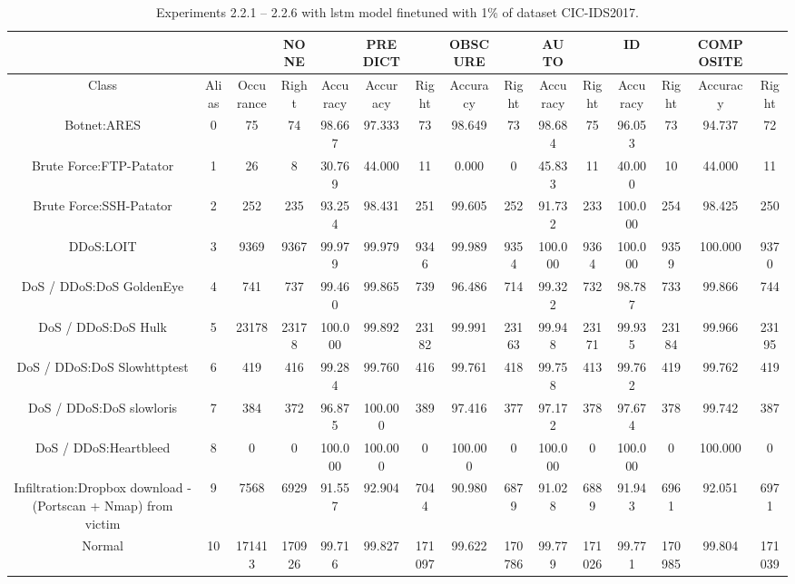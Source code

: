 \begin{table}[htb]
    \centering
    \caption{Experiments 2.2.1 – 2.2.6 with \gls{lstm} model finetuned with 1\% of dataset CIC-IDS2017.}
    \label{table:results:lstm:flows_1}
    \begin{tabular}{@{}ccccccccccccccc@{}}
        \toprule
         &  &  & NONE &  & PREDICT &  & OBSCURE &  & AUTO &  & ID &  & COMPOSITE &  \\
        \midrule
        Class &  Alias &  Occurance &  Right &  Accuracy &  Accuracy &  Right &  Accuracy &  Right &  Accuracy &  Right &  Accuracy &  Right &  Accuracy &  Right \\
        Botnet:ARES &  0 &  75 &  74 &  98.667 &  97.333 &  73 &  98.649 &  73 &  98.684 &  75 &  96.053 &  73 &  94.737 &  72 \\
        Brute Force:FTP-Patator &  1 &  26 &  8 &  30.769 &  44.000 &  11 &  0.000 &  0 &  45.833 &  11 &  40.000 &  10 &  44.000 &  11 \\
        Brute Force:SSH-Patator &  2 &  252 &  235 &  93.254 &  98.431 &  251 &  99.605 &  252 &  91.732 &  233 &  100.000 &  254 &  98.425 &  250 \\
        DDoS:LOIT &  3 &  9369 &  9367 &  99.979 &  99.979 &  9346 &  99.989 &  9354 &  100.000 &  9364 &  100.000 &  9359 &  100.000 &  9370 \\
        DoS / DDoS:DoS GoldenEye &  4 &  741 &  737 &  99.460 &  99.865 &  739 &  96.486 &  714 &  99.322 &  732 &  98.787 &  733 &  99.866 &  744 \\
        DoS / DDoS:DoS Hulk &  5 &  23178 &  23178 &  100.000 &  99.892 &  23182 &  99.991 &  23163 &  99.948 &  23171 &  99.935 &  23184 &  99.966 &  23195 \\
        DoS / DDoS:DoS Slowhttptest &  6 &  419 &  416 &  99.284 &  99.760 &  416 &  99.761 &  418 &  99.758 &  413 &  99.762 &  419 &  99.762 &  419 \\
        DoS / DDoS:DoS slowloris &  7 &  384 &  372 &  96.875 &  100.000 &  389 &  97.416 &  377 &  97.172 &  378 &  97.674 &  378 &  99.742 &  387 \\
        DoS / DDoS:Heartbleed &  8 &  0 &  0 &  100.000 &  100.000 &  0 &  100.000 &  0 &  100.000 &  0 &  100.000 &  0 &  100.000 &  0 \\
        Infiltration:Dropbox download - (Portscan + Nmap) from victim &  9 &  7568 &  6929 &  91.557 &  92.904 &  7044 &  90.980 &  6879 &  91.028 &  6889 &  91.943 &  6961 &  92.051 &  6971 \\
        Normal &  10 &  171413 &  170926 &  99.716 &  99.827 &  171097 &  99.622 &  170786 &  99.779 &  171026 &  99.771 &  170985 &  99.804 &  171039 \\

\end{tabular}
\end{table}
